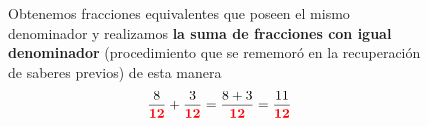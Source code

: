 \documentclass[12pt]{examdesign}
\theoremstyle{plain}
\theoremstyle{definition}
\theoremstyle{remark}
\begin{document}
\begin{endmatter}
\begin{enumerate}
			
			\begin{figure}[H]
				\begin{minipage}[b]{0.3\textwidth}
					Obtenemos fracciones equivalentes que poseen el mismo denominador y realizamos \textbf{la suma de fracciones con igual denominador} (procedimiento que se rememoró en la recuperación de saberes previos) de esta manera
					\begin{align*}
					\frac{8}{{\color{red}{\textbf{12}}}}+\frac{3}{{\color{red}{\textbf{12}}}}=\frac{8+3}{{\color{red}{\textbf{12}}}}=\frac{11}{{\color{red}{\textbf{12}}}}  
					\end{align*}
				\end{minipage}
				\hfill \begin{minipage}[b]{0.65\textwidth}
					\begin{figure}[H]
						\centering
					\end{figure}
				\end{minipage}
			\end{figure}     
		\end{enumerate}
	

\end{endmatter}
\end{document}
